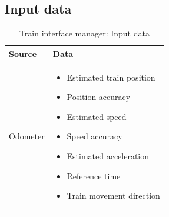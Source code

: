 \documentclass[nocc]{template/openetcs_report}
\begin{document}
\subsection{Input data}
			\begin{longtable}{|l|l|}
				\caption{Train interface manager: Input data}\\ 
				\hline
				
					\begin{minipage}[t]{0.35\linewidth} \textbf{Source}	\end{minipage} 
				&	\begin{minipage}[t]{0.65\linewidth} \textbf{Data} \end{minipage} \\
				
				\hline
																																									
					\begin{minipage}[t]{0.35\linewidth} Odometer	\end{minipage} 
				&	\begin{minipage}[t]{0.65\linewidth}
						\begin{itemize}
							\item Estimated train position
							\item Position accuracy
							\item Estimated speed
							\item Speed accuracy
							\item Estimated acceleration
							\item Reference time
							\item Train movement direction
						\end{itemize}
					\end{minipage} \\
				
				\hline
				

\end{longtable}
\end{document}
